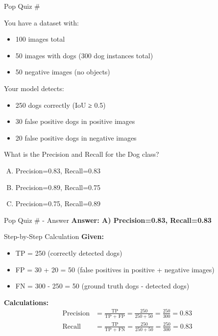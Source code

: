 \documentclass[usenames,dvipsnames]{beamer}
\begin{document}
	\begin{frame}{Pop Quiz \#\thepopquiz}
		\begin{popquizbox}{\thepopquiz}
		You have a dataset with:
		\begin{itemize}
			\item 100 images total
			\item 50 images with dogs (300 dog instances total)
			\item 50 negative images (no objects)
		\end{itemize}
		
		Your model detects:
		\begin{itemize}
			\item 250 dogs correctly (IoU ≥ 0.5)
			\item 30 false positive dogs in positive images
			\item 20 false positive dogs in negative images
		\end{itemize}
		
		What is the Precision and Recall for the Dog class?
		
		\begin{enumerate}[A)]
			\item Precision=0.83, Recall=0.83
			\item Precision=0.89, Recall=0.75
			\item Precision=0.75, Recall=0.89
		\end{enumerate}
		\end{popquizbox}
	\end{frame}
	
	\begin{frame}{Pop Quiz \#\thepopquiz{} - Answer}
		\textbf{Answer: A) Precision=0.83, Recall=0.83}
		
		\begin{examplebox}{Step-by-Step Calculation}
		\textbf{Given:}
		\begin{itemize}
			\item TP = 250 (correctly detected dogs)
			\item FP = 30 + 20 = 50 (false positives in positive + negative images)
			\item FN = 300 - 250 = 50 (ground truth dogs - detected dogs)
		\end{itemize}
		
		\textbf{Calculations:}
		\begin{align}
		\text{Precision} &= \frac{\text{TP}}{\text{TP + FP}} = \frac{250}{250 + 50} = \frac{250}{300} = 0.83 \\
		\text{Recall} &= \frac{\text{TP}}{\text{TP + FN}} = \frac{250}{250 + 50} = \frac{250}{300} = 0.83
		\end{align}
		\end{examplebox}
	\end{frame}
	
\end{document}
